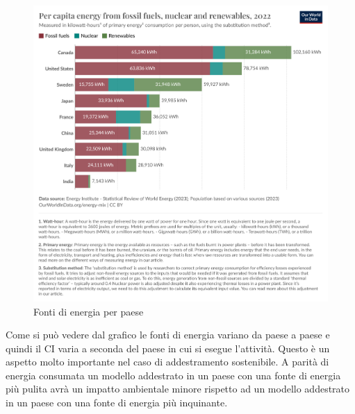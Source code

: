 \begin{figure}[H]
    \centering
    \includegraphics[scale=0.1]{images/per-capita-energy-source-stacked.png}
    \caption{Fonti di energia per paese}
\end{figure}

\noindent Come si può vedere dal grafico \cite{energy-mix} le fonti di energia variano da paese a paese e quindi il CI varia a seconda del paese in cui si esegue l'attività. Questo è un aspetto molto importante nel caso di addestramento sostenibile. A parità di energia consumata un modello addestrato in un paese con una fonte di energia più pulita avrà un impatto ambientale minore rispetto ad un modello addestrato in un paese con una fonte di energia più inquinante.\\
